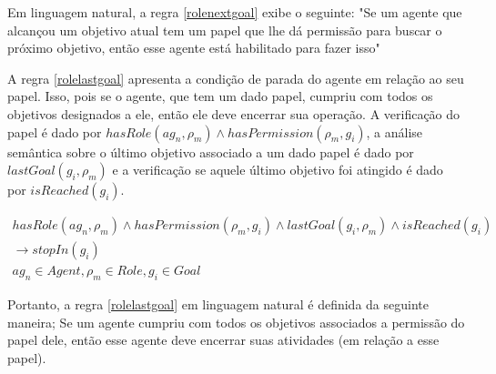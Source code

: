 Em linguagem natural, a regra \ref{rolenextgoal} exibe o seguinte: "Se um agente que alcançou um objetivo atual tem um papel que lhe dá permissão para buscar o próximo objetivo, então esse agente está habilitado para fazer isso"

A regra \ref{rolelastgoal} apresenta a condição de parada do agente em relação ao seu papel. Isso, pois se o agente, que tem um dado papel,
cumpriu com todos os objetivos designados a ele, então ele deve encerrar sua operação. A verificação do papel é dado por $hasRole(ag_n,\rho_m) \wedge hasPermission(\rho_m,g_i)$, a análise semântica sobre o último objetivo associado a um dado papel é dado por $lastGoal(g_i,\rho_m)$ e a verificação se aquele último objetivo foi atingido é dado por $isReached(g_i)$. 

\begin{eqnarray}\label{rolelastgoal}
	hasRole(ag_n,\rho_m) \wedge hasPermission(\rho_m,g_i) \wedge lastGoal(g_i,\rho_m) \wedge isReached(g_i) \nonumber \\
	\to stopIn(g_i) \nonumber \\
    ag_n \in Agent, \rho_m \in Role, g_i \in Goal
\end{eqnarray}

Portanto, a regra \ref{rolelastgoal} em linguagem natural é definida da seguinte maneira; Se um agente cumpriu com todos os objetivos associados a permissão do papel dele, então esse agente deve encerrar suas atividades (em relação a esse papel). 

